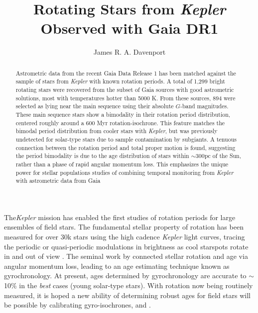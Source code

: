 \documentclass[manuscript, letterpaper]{aastex6}
\makeatletter
\let\origsection\section
\renewcommand\section{\@ifstar{\starsection}{\nostarsection}}
\newcommand\nostarsection[1]{\sectionprelude\origsection{#1}}
\newcommand\starsection[1]{\sectionprelude\origsection*{#1}}
\newcommand\sectionprelude{\vspace{1em}}
\newcommand{\Kepler}{\textsl{Kepler}\xspace}
\makeatother
\begin{document}
\title{Rotating Stars from \Kepler Observed with Gaia DR1}


\author{
	James R. A. Davenport
	}

 

 

\begin{abstract}
Astrometric data from the recent Gaia Data Release 1 has been matched against the sample of stars from \Kepler with known rotation periods. A total of 1,299 bright rotating stars were recovered from the subset of Gaia sources with good astrometric solutions, most with temperatures hotter than 5000 K. From these sources, 894 were selected as lying near the main sequence using their absolute $G$-band magnitudes. These main sequence stars show a bimodality in their rotation period distribution, centered roughly around a 600 Myr rotation-isochrone. This feature matches the bimodal period distribution from cooler stars with \Kepler, but was previously undetected for solar-type stars due to sample contamination by subgiants.
A tenuous connection between the rotation period and total proper motion is found, suggesting the period bimodality is due to the age distribution of stars within $\sim$300pc of the Sun, rather than a phase of rapid angular momentum loss.
This emphasizes the unique power for stellar populations studies of combining temporal monitoring from \Kepler with astrometric data from Gaia
\end{abstract}



\section{Introduction}

The\Kepler mission \citep{borucki2010} has enabled the first studies of rotation periods for large ensembles of field stars. The fundamental stellar property of rotation has been measured for over 30k stars using the high cadence \Kepler light curves, tracing the periodic or quasi-periodic modulations in brightness as cool starspots rotate in and out of view \citep{reinhold2013,mcquillan2014}. The seminal work by \citet{skumanich1972} connected stellar rotation and age via angular momentum loss, leading to an age estimating technique known as gyrochronology. At present, ages determined by gyrochronology are accurate to $\sim$10\% in the {\it best} cases (young solar-type stars). With rotation now being routinely measured, it is hoped a new ability of determining robust ages for field stars will be possible by calibrating gyro-isochrones, and  \citep[e.g.][]{angus2015,van-saders2016}. 
\end{document}
